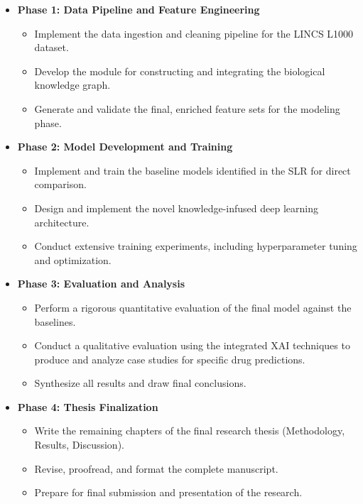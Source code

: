\documentclass[12pt,a4paper]{article}
\begin{document}
\begin{itemize}
    \item \textbf{Phase 1: Data Pipeline and Feature Engineering}
        \begin{itemize}
            \item Implement the data ingestion and cleaning pipeline for the LINCS L1000 dataset.
            \item Develop the module for constructing and integrating the biological knowledge graph.
            \item Generate and validate the final, enriched feature sets for the modeling phase.
        \end{itemize}
    
    \item \textbf{Phase 2: Model Development and Training}
        \begin{itemize}
            \item Implement and train the baseline models identified in the SLR for direct comparison.
            \item Design and implement the novel knowledge-infused deep learning architecture.
            \item Conduct extensive training experiments, including hyperparameter tuning and optimization.
        \end{itemize}
        
    \item \textbf{Phase 3: Evaluation and Analysis}
        \begin{itemize}
            \item Perform a rigorous quantitative evaluation of the final model against the baselines.
            \item Conduct a qualitative evaluation using the integrated XAI techniques to produce and analyze case studies for specific drug predictions.
            \item Synthesize all results and draw final conclusions.
        \end{itemize}
        
    \item \textbf{Phase 4: Thesis Finalization}
        \begin{itemize}
            \item Write the remaining chapters of the final research thesis (Methodology, Results, Discussion).
            \item Revise, proofread, and format the complete manuscript.
            \item Prepare for final submission and presentation of the research.
        \end{itemize}
\end{itemize}
\end{document}
